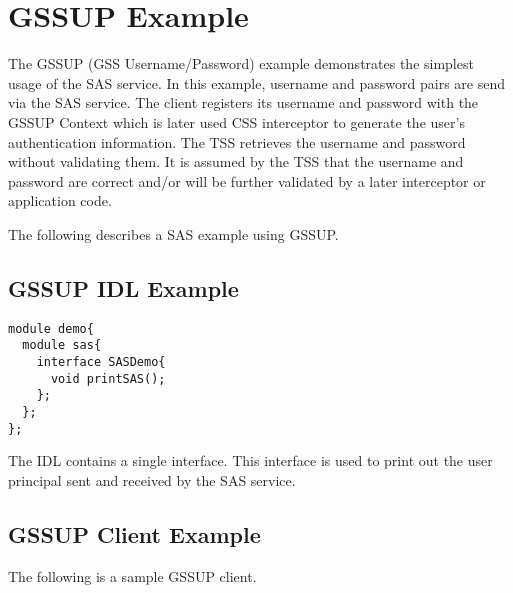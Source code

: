 \section{GSSUP Example}

The GSSUP (GSS Username/Password) example demonstrates the simplest 
usage of the SAS service. In this example, username and password
pairs are send via the SAS service. The client registers its username
and password with the GSSUP Context which is later used CSS interceptor
to generate the user's authentication information.
The TSS retrieves the username and password
without validating them. It is assumed by the TSS that the username
and password are correct and/or will be further validated by a later
interceptor or application code.

The following describes a SAS example using GSSUP.

\subsection{GSSUP IDL Example}

\begin{scriptsize}
\begin{verbatim}
module demo{
  module sas{
    interface SASDemo{
      void printSAS();
    };
  };
};
\end{verbatim}
\end{scriptsize}

The IDL contains a single interface. This interface is used to print out
the user principal sent and received by the SAS service.

\subsection{GSSUP Client Example}

The following is a sample GSSUP client.

